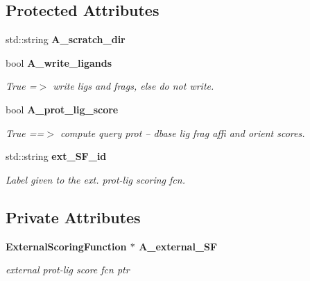 \subsection*{Protected Attributes}
\begin{CompactItemize}
\item 
std::string \textbf{A\_\-scratch\_\-dir}\label{classASCbase_1_1ScoreMapBase_784728589fd2db54ce16e5043db3c349}

\item 
bool \bf{A\_\-write\_\-ligands}\label{classASCbase_1_1ScoreMapBase_c11f067cce7e9e72f38b4cdc2abde485}

\begin{CompactList}\small\item\em True =$>$ write ligs and frags, else do not write. \item\end{CompactList}\item 
bool \bf{A\_\-prot\_\-lig\_\-score}\label{classASCbase_1_1ScoreMapBase_42d2d13e5fa5d7492495dd531246f8a5}

\begin{CompactList}\small\item\em True ==$>$ compute query prot -- dbase lig frag affi and orient scores. \item\end{CompactList}\item 
std::string \bf{ext\_\-SF\_\-id}\label{classASCbase_1_1ScoreMapBase_b6bfd4fcc3263c7ee1cc86c856cea184}

\begin{CompactList}\small\item\em Label given to the ext. prot-lig scoring fcn. \item\end{CompactList}\end{CompactItemize}
\subsection*{Private Attributes}
\begin{CompactItemize}
\item 
\bf{External\-Scoring\-Function} $\ast$ \bf{A\_\-external\_\-SF}\label{classASCbase_1_1ScoreMapBase_490667b180269340cbf0017b282eabb6}

\begin{CompactList}\small\item\em external prot-lig score fcn ptr \item\end{CompactList}\end{CompactItemize}


